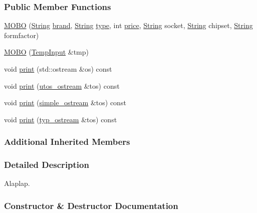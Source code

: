 \subsubsection*{Public Member Functions}
\begin{DoxyCompactItemize}
\item 
\mbox{\hyperlink{class_m_o_b_o_a3185de871765391ae3a0ffe4b0af7e5b}{M\+O\+BO}} (\mbox{\hyperlink{class_string}{String}} \mbox{\hyperlink{class_part_ae06f2fdeb7fbbdb229a7aca151f3e341}{brand}}, \mbox{\hyperlink{class_string}{String}} \mbox{\hyperlink{class_part_a101dbcc5c4b21564df7414c7eb0eae88}{type}}, int \mbox{\hyperlink{class_part_a8e71223aed1da95a974f33d8d6c91bb1}{price}}, \mbox{\hyperlink{class_string}{String}} socket, \mbox{\hyperlink{class_string}{String}} chipset, \mbox{\hyperlink{class_string}{String}} formfactor)
\item 
\mbox{\hyperlink{class_m_o_b_o_a544dc57e821c152a922a3d8bc9913500}{M\+O\+BO}} (\mbox{\hyperlink{struct_temp_input}{Temp\+Input}} \&tmp)
\item 
void \mbox{\hyperlink{class_m_o_b_o_a3241f425030e01d5b7a192c23af2dbda}{print}} (std\+::ostream \&os) const
\item 
void \mbox{\hyperlink{class_m_o_b_o_a4c78cec3a2a3e4d4480855622f50bd06}{print}} (\mbox{\hyperlink{structutos__ostream}{utos\+\_\+ostream}} \&tos) const
\item 
void \mbox{\hyperlink{class_m_o_b_o_a01fed4470cbf8c58f86426aa8f52b225}{print}} (\mbox{\hyperlink{structsimple__ostream}{simple\+\_\+ostream}} \&tos) const
\item 
void \mbox{\hyperlink{class_m_o_b_o_a3dd7e36103afbb4b6c09b65975317b9c}{print}} (\mbox{\hyperlink{structtyp__ostream}{typ\+\_\+ostream}} \&tos) const
\end{DoxyCompactItemize}
\subsubsection*{Additional Inherited Members}


\subsubsection{Detailed Description}
Alaplap. 

\subsubsection{Constructor \& Destructor Documentation}
\mbox{\label{class_m_o_b_o_a3185de871765391ae3a0ffe4b0af7e5b}} 
